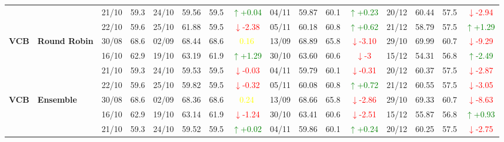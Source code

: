 \documentclass{ieeeaccess}
\begin{document}
{\begin{longtable}{llcc|cccc|cccc|cccc}
&
& 21/10 & 59.3 & 24/10 & 59.56 & 59.5 & \textcolor{green}{\(\uparrow\)+0.04} & 04/11 & 59.87 & 60.1 & \textcolor{green}{\(\uparrow\)+0.23} & 20/12 & 60.44 & 57.5 & \textcolor{red}{\(\downarrow\)-2.94} \\

&
& 22/10 & 59.6 & 25/10 & 61.88 & 59.5 & \textcolor{red}{\(\downarrow\)-2.38} & 05/11 & 60.18 & 60.8 & \textcolor{green}{\(\uparrow\)+0.62} & 21/12 & 58.79 & 57.5 & \textcolor{green}{\(\uparrow\)+1.29} \\
\midrule


\multirow{4}{*}{\textbf{VCB}} 
& \textbf{Round Robin}
& 30/08 & 68.6 & 02/09 & 68.44 & 68.6 & \textcolor{yellow}{0.16} & 13/09 & 68.89 & 65.8 & \textcolor{red}{\(\downarrow\)-3.10} & 29/10 & 69.99 & 60.7 & \textcolor{red}{\(\downarrow\)-9.29} \\

&
& 16/10 & 62.9 & 19/10 & 63.19 & 61.9 & \textcolor{green}{\(\uparrow\)+1.29} & 30/10 & 63.60 & 60.6 & \textcolor{red}{\(\downarrow\)-3} & 15/12 & 54.31 & 56.8 & \textcolor{green}{\(\uparrow\)-2.49} \\

&
& 21/10 & 59.3 & 24/10 & 59.53 & 59.5 & \textcolor{red}{\(\downarrow\)-0.03} & 04/11 & 59.79 & 60.1 & \textcolor{red}{\(\downarrow\)-0.31} & 20/12 & 60.37 & 57.5 & \textcolor{red}{\(\downarrow\)-2.87} \\

&
& 22/10 & 59.6 & 25/10 & 59.82 & 59.5 & \textcolor{red}{\(\downarrow\)-0.32} & 05/11 & 60.08 & 60.8 & \textcolor{green}{\(\uparrow\)+0.72} & 21/12 & 60.55 & 57.5 & \textcolor{red}{\(\downarrow\)-3.05} \\
\midrule

\multirow{4}{*}{\textbf{VCB}} 
& \textbf{Ensemble}
& 30/08 & 68.6 & 02/09 & 68.36 & 68.6 & \textcolor{yellow}{0.24} & 13/09 & 68.66 & 65.8 & \textcolor{red}{\(\downarrow\)-2.86} & 29/10 & 69.33 & 60.7 & \textcolor{red}{\(\downarrow\)-8.63} \\

&
& 16/10 & 62.9 & 19/10 & 63.14 & 61.9 & \textcolor{red}{\(\downarrow\)-1.24} & 30/10 & 63.41 & 60.6 & \textcolor{red}{\(\downarrow\)-2.51} & 15/12 & 55.87 & 56.8 & \textcolor{green}{\(\uparrow\)+0.93} \\

&
& 21/10 & 59.3 & 24/10 & 59.52 & 59.5 & \textcolor{green}{\(\uparrow\)+0.02} & 04/11 & 59.86 & 60.1 & \textcolor{green}{\(\uparrow\)+0.24} & 20/12 & 60.25 & 57.5 & \textcolor{red}{\(\downarrow\)-2.75} \\


\end{longtable}}
\end{document}
